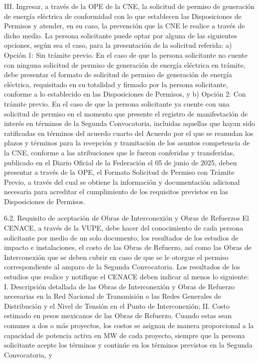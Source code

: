 III. Ingresar, a través de la OPE de la CNE, la solicitud de permiso de generación de energía eléctrica de conformidad con lo que establecen las Disposiciones de Permisos y atender, en su caso, la prevención que la CNE le realice a través de dicho medio.
La persona solicitante puede optar por alguna de las siguientes opciones, según sea el caso, para la presentación de la solicitud referida:
a) Opción 1: Sin trámite previo. En el caso de que la persona solicitante no cuente con ninguna solicitud de permiso de generación de energía eléctrica en trámite, debe presentar el formato de solicitud de permiso de generación de energía eléctrica, requisitado en su totalidad y firmado por la persona solicitante, conforme a lo establecido en las Disposiciones de Permisos, y
b) Opción 2: Con trámite previo. En el caso de que la persona solicitante ya cuente con una solicitud de permiso en el momento que presente el registro de manifestación de interés en términos de la Segunda Convocatoria, incluidas aquellas que hayan sido ratificadas en términos del acuerdo cuarto del Acuerdo por el que se reanudan los plazos y términos para la recepción y tramitación de los asuntos competencia de la CNE, conforme a las atribuciones que le fueron conferidas y transferidas, publicado en el Diario Oficial de la Federación el 05 de junio de 2025, deben presentar a través de la OPE, el Formato Solicitud de Permiso con Trámite Previo, a través del cual se obtiene la información y documentación adicional necesaria para acreditar el cumplimiento de los requisitos previstos en las Disposiciones de Permisos.\par
6.2. Requisito de aceptación de Obras de Interconexión y Obras de Refuerzos
El CENACE, a través de la VUPE, debe hacer del conocimiento de cada persona solicitante por medio de un solo documento, los resultados de los estudios de impacto e instalaciones, el costo de las Obras de Refuerzo, así como las Obras de Interconexión que se deben cubrir en caso de que se le otorgue el permiso correspondiente al amparo de la Segunda Convocatoria.
Los resultados de los estudios que realice y notifique el CENACE deben indicar al menos lo siguiente:
I. Descripción detallada de las Obras de Interconexión y Obras de Refuerzo necesarias en la Red Nacional de Transmisión o las Redes Generales de Distribución y el Nivel de Tensión en el Punto de Interconexión;
II. Costo estimado en pesos mexicanos de las Obras de Refuerzo. Cuando estas sean comunes a dos o más proyectos, los costos se asignan de manera proporcional a la capacidad de potencia activa en MW de cada proyecto, siempre que la persona solicitante acepte los términos y continúe en los términos previstos en la Segunda Convocatoria, y
